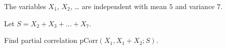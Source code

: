 
\begin{question}
The variables \(X_1\), \(X_2\), \ldots{} are independent with mean \(5\) and variance \(7\).

Let \(S = X_{2} + X_{3} + \ldots + X_{7}\).

Find partial correlation \(\mathrm{pCorr}(X_1, X_1 + X_2; S)\).
\end{question}


